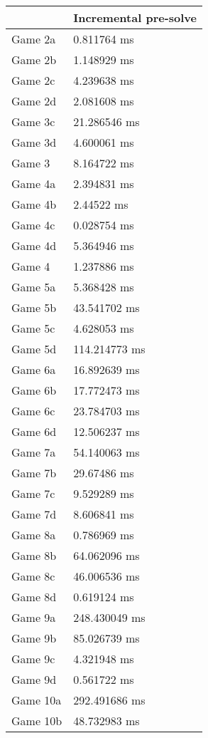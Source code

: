 \begin{tabular}{|l|l|}
	\hline
	& Incremental pre-solve \\ \hline
	Game 2a & 0.811764 ms \\ \hline
	Game 2b & 1.148929 ms \\ \hline
	Game 2c & 4.239638 ms \\ \hline
	Game 2d & 2.081608 ms \\ \hline
	Game 3c & 21.286546 ms \\ \hline
	Game 3d & 4.600061 ms \\ \hline
	Game 3 & 8.164722 ms \\ \hline
	Game 4a & 2.394831 ms \\ \hline
	Game 4b & 2.44522 ms \\ \hline
	Game 4c & 0.028754 ms \\ \hline
	Game 4d & 5.364946 ms \\ \hline
	Game 4 & 1.237886 ms \\ \hline
	Game 5a & 5.368428 ms \\ \hline
	Game 5b & 43.541702 ms \\ \hline
	Game 5c & 4.628053 ms \\ \hline
	Game 5d & 114.214773 ms \\ \hline
	Game 6a & 16.892639 ms \\ \hline
	Game 6b & 17.772473 ms \\ \hline
	Game 6c & 23.784703 ms \\ \hline
	Game 6d & 12.506237 ms \\ \hline
	Game 7a & 54.140063 ms \\ \hline
	Game 7b & 29.67486 ms \\ \hline
	Game 7c & 9.529289 ms \\ \hline
	Game 7d & 8.606841 ms \\ \hline
	Game 8a & 0.786969 ms \\ \hline
	Game 8b & 64.062096 ms \\ \hline
	Game 8c & 46.006536 ms \\ \hline
	Game 8d & 0.619124 ms \\ \hline
	Game 9a & 248.430049 ms \\ \hline
	Game 9b & 85.026739 ms \\ \hline
	Game 9c & 4.321948 ms \\ \hline
	Game 9d & 0.561722 ms \\ \hline
	Game 10a & 292.491686 ms \\ \hline
	Game 10b & 48.732983 ms \\ \hline

\end{tabular}
